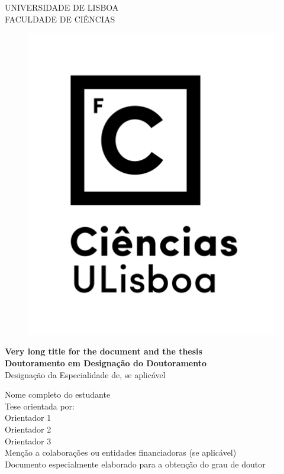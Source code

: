 \pagestyle{FirstPages}

\begin{center}
\begin{minipage}{0.45\linewidth}
    \centering
    UNIVERSIDADE DE LISBOA\\
    FACULDADE DE CI\^{E}NCIAS\\
\end{minipage}

\begin{figure}[h!]
    \centering
    \includegraphics[width=0.35\columnwidth]{./logos/ciencias_vertical_rgb_preto.png}
\end{figure}

\vspace{1.0cm}
\textbf{\foreignlanguage{british}{Very long title for the document and the thesis}}\\
\vspace{1.5cm}
\textbf{Doutoramento em Designação do Doutoramento}\\
{Designação da Especialidade de, se aplicável}
\vspace{3.5cm}
        
Nome completo do estudante\\
\vspace{1.5cm}
Tese orientada por:\\
Orientador 1\\
Orientador 2\\
Orientador 3\\
\vspace{2.0cm}
{Menção a colaborações ou entidades financiadoras (se aplicável)\\}
\vspace{1.5cm}
Documento especialmente elaborado para a obten\c{c}\~{a}o do grau de doutor
\vfill
\end{center}
